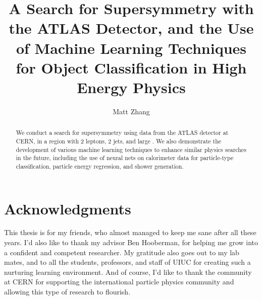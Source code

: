 \title{A Search for Supersymmetry with the ATLAS Detector, and the Use of Machine Learning Techniques for Object Classification in High Energy Physics}
\author{Matt Zhang}
\phdthesis
{}
\maketitle

\frontmatter

\begin{abstract}
We conduct a search for supersymmetry using data from the ATLAS detector at CERN, in a region with 2 leptons, 2 jets, and large \MET. We also demonstrate the development of various machine learning techniques to enhance similar physics searches in the future, including the use of neural nets on calorimeter data for particle-type classification, particle energy regression, and shower generation.
\end{abstract}

\chapter*{Acknowledgments}

This thesis is for my friends, who almost managed to keep me sane after all these years. I'd also like to thank my advisor Ben Hooberman, for helping me grow into a confident and competent researcher. My gratitude also goes out to my lab mates, and to all the students, professors, and staff of UIUC for creating such a nurturing learning environment. And of course, I'd like to thank the community at CERN for supporting the international particle physics community and allowing this type of research to flourish.